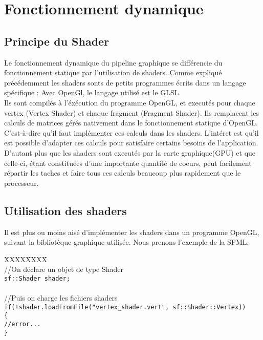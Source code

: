 \section{Fonctionnement dynamique}

\subsection{Principe du Shader}

Le fonctionnement dynamique du pipeline graphique se différencie du fonctionnement statique par l'utilisation de shaders.
Comme expliqué précédemment les shaders sonts de petits programmes écrits dans un langage spécifique : Avec OpenGl, le langage utilisé est le GLSL.\\
Ils sont compilés à l'éxécution du programme OpenGL, et executés pour chaque vertex (Vertex Shader) et chaque fragment (Fragment Shader).
Ils remplacent les calculs de matrices gérés nativement dans le fonctionnement statique d'OpenGL. C'est-à-dire qu'il faut implémenter ces calculs dans les shaders. L'intéret est qu'il est possible d'adapter ces calculs pour satisfaire certains besoins de l'application. D'autant plus que les shaders sont executés par la carte graphique(GPU) et que celle-ci, étant constituées d'une importante quantité de coeurs, peut facilement répartir les taches et faire tous ces calculs beaucoup plus rapidement que le processeur.

\subsection{Utilisation des shaders}

Il est plus ou moins aisé d'implémenter les shaders dans un programme OpenGL, suivant la bibliotèque graphique utilisée.
Nous prenons l'exemple de la SFML:\\

\begin{tabbing}
XXXX\=XXXX\= \kill\\
\> //On déclare un objet de type Shader\\
\> \verb|sf::Shader shader;|\\
\\
\>//Puis on charge les fichiers shaders\\
\> \verb|if(!shader.loadFromFile("vertex_shader.vert", sf::Shader::Vertex))|\\
\> \verb|{|\\
\> \>\verb|//error...|\\
\> \verb|}|\\
\end{tabbing}

